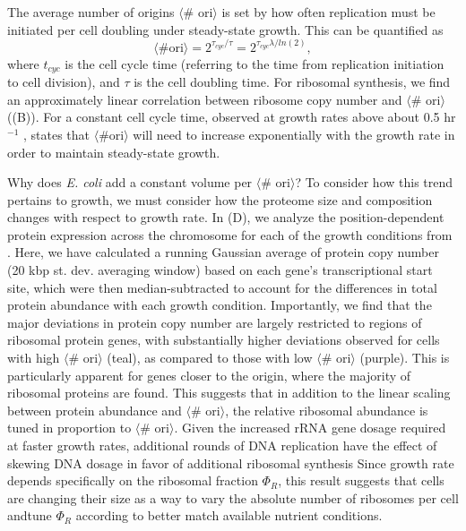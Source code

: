 The average number of origins $\langle$\# ori$\rangle$ is set by how often
replication must be initiated per cell doubling under steady-state growth.
This can be quantified as
\begin{equation}
    \langle \text{\# ori} \rangle = 2^{\tau_{cyc} / \tau} = 2^{\tau_{cyc} \lambda / ln(2)},
    \label{eq:Nori}
\end{equation}
where $t_{cyc}$ is the cell cycle time (referring to the time from replication
initiation to cell division), and $\tau$ is the cell doubling time. For
ribosomal synthesis, we find an approximately linear correlation between
ribosome copy number and $\langle$\# ori$\rangle$
((B)). For a constant cell cycle time, observed at
growth rates above about 0.5 hr$^{-1}$ \citep{helmstetter1968},  states
that $\langle \text{\# ori} \rangle$ will need to increase exponentially with
the growth rate in order to maintain steady-state growth.


Why does \textit{E. coli} add a constant volume per $\langle$\# ori$\rangle$?
To consider how this trend pertains to growth, we must consider
how the proteome size and composition changes with respect to growth rate. In
(D), we analyze the position-dependent protein
expression across the chromosome for each of the growth conditions from
\cite{schmidt2016}. Here, we have calculated a running Gaussian average of
protein copy number (20 kbp st. dev. averaging window) based on each gene's
transcriptional start site, which were then median-subtracted to account for the
differences in total protein abundance with each growth condition. Importantly,
we find that the major deviations in protein copy number are largely restricted
to regions of ribosomal protein genes, with substantially higher deviations
observed for cells with high $\langle$\# ori$\rangle$ (teal), as compared to
those with low $\langle$\# ori$\rangle$ (purple). This is particularly apparent
for genes closer to the origin, where the majority of ribosomal proteins are
found. This suggests that in addition to the linear scaling between protein
abundance and $\langle$\# ori$\rangle$, the relative ribosomal abundance is
tuned in proportion to $\langle$\# ori$\rangle$.  Given the increased rRNA gene
dosage required at faster growth rates, additional rounds of DNA replication
have the effect of skewing DNA dosage in favor of additional ribosomal synthesis
Since growth rate depends specifically on the ribosomal fraction $\Phi_R$, this
result suggests that cells are changing their size as a way to vary the absolute
number of ribosomes per cell andtune $\Phi_R$ according to better match
available nutrient conditions.



